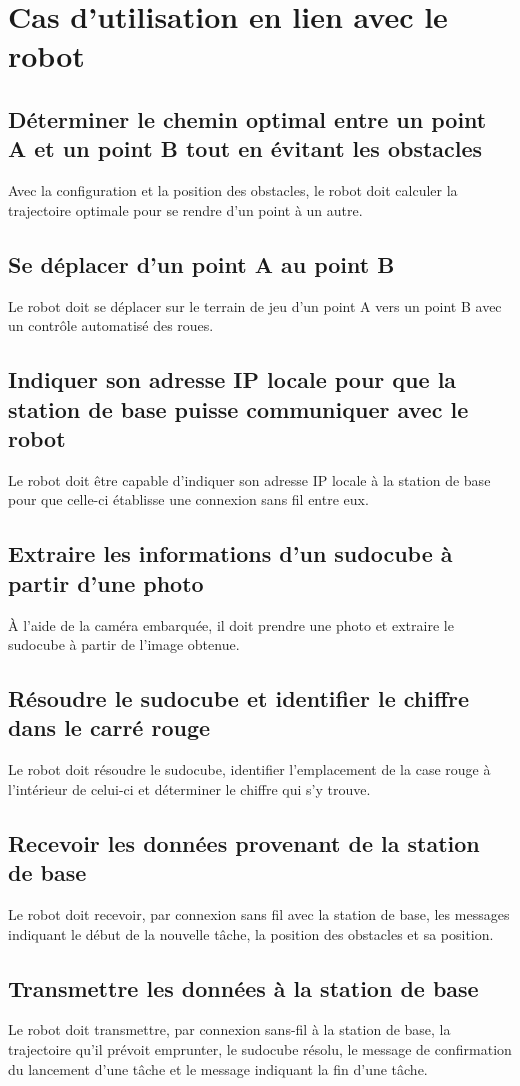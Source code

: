 \section{Cas d'utilisation en lien avec le robot}
\subsection{Déterminer le chemin optimal entre un point A et un point B tout en évitant les obstacles}
Avec la configuration et la position des obstacles, le robot doit calculer la trajectoire optimale pour se rendre d'un point à un autre.
\subsection{Se déplacer d'un point A au point B}
Le robot doit se déplacer sur le terrain de jeu d'un point A vers un point B avec un contrôle automatisé des roues.
\subsection{Indiquer son adresse IP locale pour que la station de base puisse communiquer avec le robot}
Le robot doit être capable d'indiquer son adresse IP locale à la station de base pour que celle-ci établisse une connexion sans fil entre eux.
\subsection{Extraire les informations d'un sudocube à partir d'une photo}
À l'aide de la caméra embarquée, il doit prendre une photo et extraire le sudocube à partir de l'image obtenue.
\subsection{Résoudre le sudocube et identifier le chiffre dans le carré rouge}
Le robot doit résoudre le sudocube, identifier l'emplacement de la case rouge à l'intérieur de celui-ci et déterminer le chiffre qui s'y trouve.
\subsection{Recevoir les données provenant de la station de base}
Le robot doit recevoir, par connexion sans fil avec la station de base, les messages indiquant le début de la nouvelle tâche, la position des obstacles et sa position.
\subsection{Transmettre les données à la station de base}
Le robot doit transmettre, par connexion sans-fil à la station de base, la trajectoire qu’il prévoit emprunter, le sudocube résolu, le message de confirmation du lancement d'une tâche et le message indiquant la fin d'une tâche.
